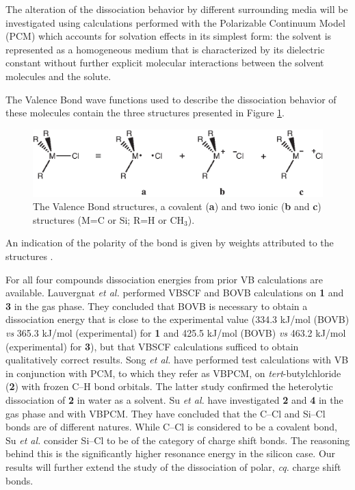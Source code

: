 The alteration of the dissociation behavior by different surrounding media will be investigated using calculations performed with the Polarizable Continuum Model (PCM) \cite{pcm1,pcm2} which accounts for solvation effects in its simplest form: the solvent is represented as a homogeneous medium that is characterized by its dielectric constant without further explicit molecular interactions between the solvent molecules and the solute. 

The Valence Bond wave functions used to describe the dissociation behavior of these molecules contain the three structures presented in Figure \ref{ch3.fig.structures}.
\begin{figure}[htbp]
\begin{center}
\includegraphics{dissociation/figures/structures.eps}
\end{center}
\caption{The Valence Bond structures, a covalent (\textbf{a}) and two ionic (\textbf{b} and \textbf{c}) structures (M=C or Si; R=H or CH$_3$).}
\label{ch3.fig.structures}
\end{figure}
An indication of the polarity of the bond is given by weights attributed to the structures \cite{coulson}. 

For all four compounds dissociation energies from prior VB calculations are available. Lauvergnat \textit{et al.} \cite{lauvergnat} performed VBSCF \cite{vbscf1,vbscf2} and BOVB \cite{bovb1,bovb2,bovb3} calculations on \textbf{1} and \textbf{3} in the gas phase. They concluded that BOVB is necessary to obtain a dissociation energy that is close to the experimental value (334.3 kJ/mol (BOVB) \textit{vs} 365.3 kJ/mol (experimental) for \textbf{1} and 425.5 kJ/mol (BOVB) \textit{vs} 463.2 kJ/mol (experimental) for \textbf{3}), but that VBSCF calculations sufficed to obtain qualitatively correct results.  Song \textit{et al.} \cite{song} have performed test calculations with VB in conjunction with PCM, to which they refer as VBPCM, on \textit{tert}-butylchloride (\textbf{2}) with frozen C--H bond orbitals. The latter study confirmed the heterolytic dissociation of \textbf{2} in water as a solvent. Su \textit{et al.} \cite{psu} have investigated \textbf{2} and \textbf{4} in the gas phase and with VBPCM. They have concluded that the C--Cl and Si--Cl bonds are of different natures. While C--Cl is considered to be a covalent bond, Su \textit{et al.} consider Si--Cl to be of the category of charge shift bonds. The reasoning behind this is the significantly higher resonance energy in the silicon case. Our results will further extend the study of the dissociation of polar, \textit{cq.} charge shift bonds.

